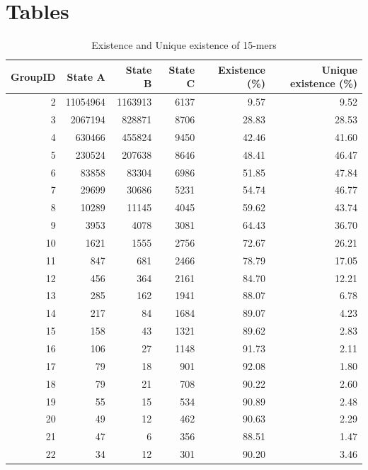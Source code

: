 \documentclass[11pt]{article}
\begin{document}
\clearpage

\appendix
\section{Tables}\label{append}

\begin{longtable}{r|r|r|r|r|r}
\caption{Existence and Unique existence of 15-mers}\\
\toprule
\textbf{GroupID} & \textbf{State A} & \textbf{State B} & \textbf{State C} & \textbf{Existence (\%)} & \textbf{Unique existence (\%)}\\
\midrule
\endhead
    2     & 11054964 & 1163913 & 6137  & 9.57 & 9.52 \\
    3     & 2067194 & 828871 & 8706  & 28.83 & 28.53 \\
    4     & 630466 & 455824 & 9450  & 42.46 & 41.60 \\
    5     & 230524 & 207638 & 8646  & 48.41 & 46.47 \\
    6     & 83858 & 83304 & 6986  & 51.85 & 47.84 \\
    7     & 29699 & 30686 & 5231  & 54.74 & 46.77 \\
    8     & 10289 & 11145 & 4045  & 59.62 & 43.74 \\
    9     & 3953  & 4078  & 3081  & 64.43 & 36.70 \\
    10    & 1621  & 1555  & 2756  & 72.67 & 26.21 \\
    11    & 847   & 681   & 2466  & 78.79 & 17.05 \\
    12    & 456   & 364   & 2161  & 84.70 & 12.21 \\
    13    & 285   & 162   & 1941  & 88.07 & 6.78 \\
    14    & 217   & 84    & 1684  & 89.07 & 4.23 \\
    15    & 158   & 43    & 1321  & 89.62 & 2.83 \\
    16    & 106   & 27    & 1148  & 91.73 & 2.11 \\
    17    & 79    & 18    & 901   & 92.08 & 1.80 \\
    18    & 79    & 21    & 708   & 90.22 & 2.60 \\
    19    & 55    & 15    & 534   & 90.89 & 2.48 \\
    20    & 49    & 12    & 462   & 90.63 & 2.29 \\
    21    & 47    & 6     & 356   & 88.51 & 1.47 \\
    22    & 34    & 12    & 301   & 90.20 & 3.46 \\

\end{longtable}
\end{document}
